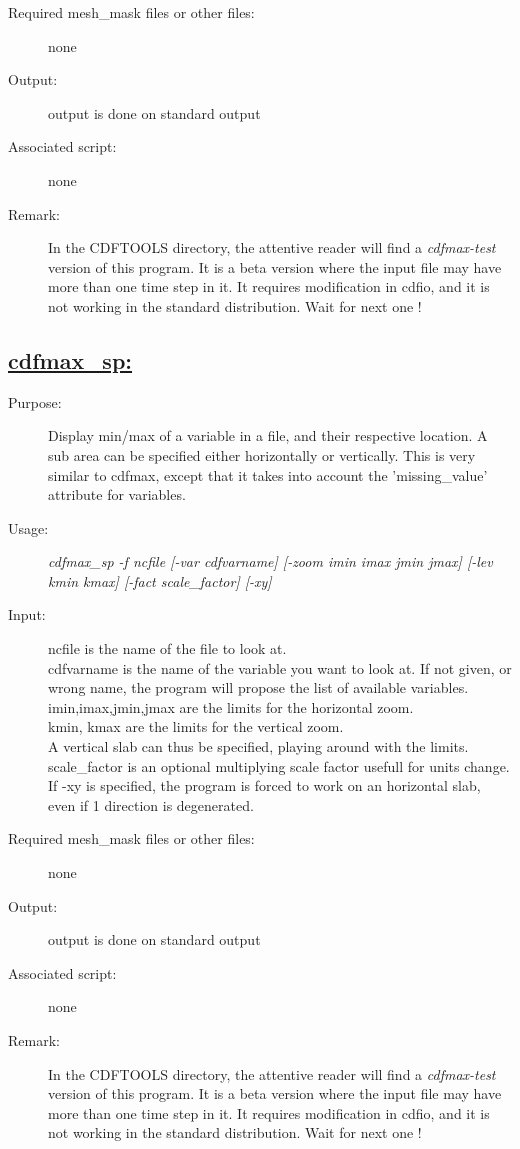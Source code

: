 \documentclass[a4paper,11pt]{article}
\begin{document}
\begin{description}
\item[Required mesh\_mask files or other files:] none
\item[Output:] output is done on standard output
\item[Associated script:] none
\item[Remark:] In the CDFTOOLS directory, the attentive reader will find a {\em cdfmax-test} version of this program. It is a beta
version  where the input file may have more than one time step in it. It requires modification in cdfio, and it is not working in
the standard distribution. Wait for next one !
\end{description}

\newpage
\subsection*{\underline{cdfmax\_sp:}}
\begin{description}
\item[Purpose:] Display min/max of a variable in a file, and their respective location. A sub area can be specified either horizontally or vertically.
        This is very similar to cdfmax, except that it takes into account the 'missing\_value' attribute for variables.
\item[Usage:] {\em cdfmax\_sp -f ncfile [-var cdfvarname] [-zoom imin imax jmin jmax] [-lev kmin kmax] [-fact scale\_factor] [-xy] }
\item[Input:] ncfile is the name of the file to look at. \\
      cdfvarname is the name of the variable you want to look at. If not given, or wrong name, the program will propose the list of
    available variables. \\
     imin,imax,jmin,jmax are the limits for the horizontal zoom.  \\
     kmin, kmax  are the limits for the vertical zoom. \\
     A vertical slab can thus be specified, playing around with the limits. \\
     scale\_factor is an optional multiplying scale factor usefull for units change. \\
     If -xy is specified, the program is forced to work on an horizontal slab, even if 1 direction is degenerated.

\item[Required mesh\_mask files or other files:] none
\item[Output:] output is done on standard output
\item[Associated script:] none
\item[Remark:] In the CDFTOOLS directory, the attentive reader will find a {\em cdfmax-test} version of this program. It is a beta
version  where the input file may have more than one time step in it. It requires modification in cdfio, and it is not working in
the standard distribution. Wait for next one !
\end{description}
\end{document}
